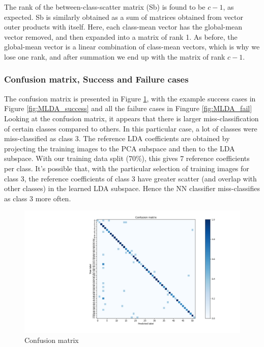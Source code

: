\documentclass[10pt,technote]{IEEEtran}
\begin{document}
The rank of the between-class-scatter matrix (Sb) is found to be $c - 1$, as expected. Sb is similarly obtained as a sum of matrices obtained from vector outer products with itself. Here, each class-mean vector has the global-mean vector removed, and then expanded into a matrix of rank 1. As before, the global-mean vector is a linear combination of class-mean vectors, which is why we lose one rank, and after summation we end up with the matrix of rank $c - 1$.

\subsubsection{Confusion matrix, Success and Failure cases}
The confusion matrix is presented in Figure \ref{fig:M_LDA_conf_mat}, with the example success cases in Figure \ref{fig:MLDA_success} and all the failure cases in Fingure \ref{fig:MLDA_fail}
Looking at the confusion matrix, it appears that there is larger miss-classification of certain classes compared to others. In this particular case, a lot of classes were miss-classified as class 3. The reference LDA coefficients are obtained by projecting the training images to the PCA subspace and then to the LDA subspace. With our training data split (70\%), this gives 7 reference coefficients per class. It's possible that, with the particular selection of training images for class 3, the reference coefficients of class 3 have greater scatter (and overlap with other classes) in the learned LDA subspace. Hence the NN classifier miss-classifies as class 3 more often.

\begin{figure}[htb!]
    \centering
    \includegraphics[width = \linewidth]{../results/ex2LDA/LDA_Conf_mat2.png}
    \caption{Confusion matrix}
    \label{fig:M_LDA_conf_mat}
\end{figure}
\end{document}
